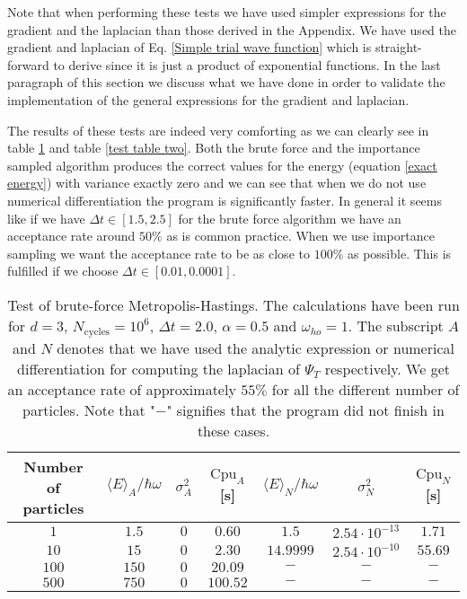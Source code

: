 \documentclass[a4paper,10pt]{article}
\begin{document}
Note that when performing these tests we have used simpler expressions for the gradient and the laplacian than those derived in the Appendix.
We have used the gradient and laplacian of Eq. \ref{Simple trial wave function} which is straight-forward to derive since it is just a product of exponential functions.
In the last paragraph of this section we discuss what we have done in order to validate the implementation of the general expressions for the gradient 
and laplacian.

The results of these tests are indeed very comforting as we can clearly see in table \ref{test table one} and table \ref{test table two}. 
Both the brute force and the importance sampled algorithm produces the correct values for the energy (equation \ref{exact energy}) with variance exactly zero and we can see that when 
we do not use numerical differentiation the program is significantly faster. In general it seems like if we have $\Delta t \in [1.5,2.5]$ for the 
brute force algorithm we have an acceptance rate around $50\%$ as is common practice. When we use importance sampling we want the acceptance rate
to be as close to $100\%$ as possible. This is fulfilled if we choose $\Delta t \in [0.01,0.0001]$.
\begin{table}[h!]
    \centering
    \caption{Test of brute-force Metropolis-Hastings. The calculations have been run for $d=3$, $N_{\text{cycles}} = 10^6$, 
    $\Delta t = 2.0$, $\alpha = 0.5$ and $\omega_{ho} = 1$. 
    The subscript $A$ and $N$ denotes that we have used the analytic expression or numerical differentiation for computing 
    the laplacian of $\Psi_T$ respectively. We get an acceptance rate of approximately $55\%$ for all the different number of particles. Note that "$-$" signifies
    that the program did not finish in these cases.}
    \begin{tabular}{ c  c  c  c c c c }
    \hline
    \hline
    Number of particles   & $\langle E \rangle_A/\hbar \omega$ & $\sigma^2_A$ & $\text{Cpu}_A$[s] & $\langle E \rangle_N/\hbar \omega$ &  $\sigma^2_N$ &  $\text{Cpu}_N$[s]    \\ 
    \hline
    $1$   & $1.5 $               & $0$             & $0.60$ & $1.5$    &            $2.54 \cdot 10^{-13}$     &          $1.71$             \\ 
    $10$  & $15$                 & $0$            & $2.30$   & $14.9999$   &          $2.54 \cdot 10^{-10}$     &            $55.69$           \\ 
    $100$ & $150$                & $0$            & $20.09$  &  $-$   &         $-$     &            $-$         \\ 
    $500$ & $750$                & $0$                  & $100.52$&  $-$    &        $-$                     &              $-$            \\ 
    \hline
    \hline
    \end{tabular}
    \label{test table one}
\end{table}
\end{document}
